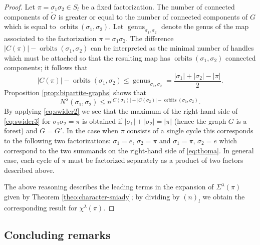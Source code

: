 \documentclass[12pt]{amsart}
\theoremstyle{plain}
\theoremstyle{remark}
\DeclareMathOperator{\orbits}{orbits}
\DeclareMathOperator{\genus}{genus}
\begin{document}
{\begin{proof}
Let $\pi=\sigma_1 \sigma_2\in S_l$ be a fixed factorization. 
The number of connected components of $\tilde{G}$ is greater or equal to the number of
connected components of $G$ which is equal to  $\orbits(\sigma_1,\sigma_2)$.
Let $\genus_{\sigma_1,\sigma_2}$ denote the genus of the map associated to the factorization
$\pi=\sigma_1 \sigma_2$. The difference  $|C(\pi)| - \orbits(\sigma_1,\sigma_2)$ can be interpreted
as the minimal number of handles which must be attached so that the resulting map has $\orbits(\sigma_1,\sigma_2)$
connected components; it follows that
\begin{equation}
\label{eq:swider2} |C(\pi)| - \orbits(\sigma_1,\sigma_2)  \leq \genus_{\sigma_1,\sigma_2}=
\frac{|\sigma_1|+|\sigma_2|-|\pi|}{2}. 
\end{equation}
Proposition \ref{prop:bipartite-graphs} shows that
\begin{equation}
\label{eq:swider3}
N^{\lambda}(\sigma_1,\sigma_2) \leq n^{|C(\sigma_1)|+|C(\sigma_2)|-\orbits(\sigma_1,\sigma_2)}. 
\end{equation}
By applying \eqref{eq:swider2} we see that the maximum of the right-hand side of \eqref{eq:swider3} for
$\sigma_1\sigma_2=\pi$ is obtained if $|\sigma_1|+|\sigma_2|=|\pi|$ (hence the graph $G$ is
a forest) and $G=G'$. In the case when $\pi$ consists of a single cycle this corresponds
to the following two factorizations: $\sigma_1=e$, $\sigma_2=\pi$ and
$\sigma_1=\pi$, $\sigma_2=e$ which correspond to the two summands on the right-hand side
of \eqref{eq:thoma}. In general case, each cycle of $\pi$ must be factorized separately as
a product of two factors described above.

The above reasoning describes the leading terms in the expansion of $\Sigma^{\lambda}(\pi)$ given by
Theorem \ref{theo:character-sniady}; by dividing by $(n)_l$ we obtain the corresponding result for
$\chi^{\lambda}(\pi)$.
\end{proof}
}

\subsection{Concluding remarks}
\end{document}

